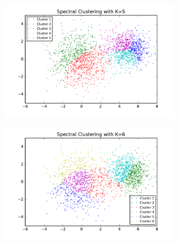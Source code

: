 \begin{description}
\begin{description}
\begin{figure}[!h]
\begin{subfigure}[b]{0.475\textwidth}
        \end{subfigure}
        \begin{subfigure}[b]{0.475\textwidth}  
            \centering 
            \includegraphics[width=\textwidth]{./figures/clustering_spectral_5.pdf}
        \end{subfigure}
        \hfill
        \begin{subfigure}[b]{0.475\textwidth}   
            \centering 
            \includegraphics[width=\textwidth]{./figures/clustering_spectral_6.pdf}
        \end{subfigure}
        \begin{subfigure}[b]{0.475\textwidth}   
            \centering 

\end{subfigure}
\end{figure}
\end{description}
\end{description}
